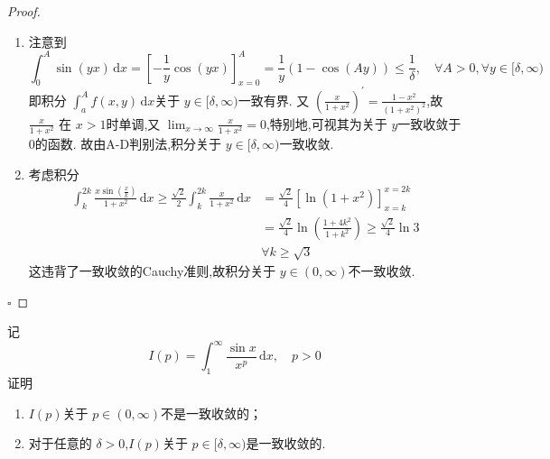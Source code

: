 \documentclass[lang=cn,12pt,color=green,fontset=none,thmcnt=section]{elegantbook}
\begin{document}
\begin{proof}
    \begin{enumerate}
        \item 注意到 $$
        \int_{0}^{A}\sin \left( yx \right)\,\mathrm{d} x =   \left[  -\frac{1}{y}\cos \left( yx \right) \right]_{x=0}^{A}   = \frac{1}{y}\left( 1-\cos \left( Ay \right)  \right) \le \frac{1}{ \delta },\quad \forall A >0,\forall y \in [ \delta ,\infty)
        $$即积分 $ \int_{a}^{A}f\left( x,y \right)\,\mathrm{d} x  $关于 $ y \in [ \delta ,\infty) $一致有界. 又 $ \left( \frac{x}{1+ x^{2}} \right)^{\prime}  =  \frac{1-x^{2} }{ \left( 1+ x^{2} \right)^{2} }    $,故 $ \frac{x}{1+ x^{2}} $   在 $ x>1 $时单调,又 $ \lim_{x \to \infty} \frac{x}{1+ x^{2}} =0$,特别地,可视其为关于 $ y $一致收敛于0的函数.
        故由A-D判别法,积分关于 $ y \in [ \delta ,\infty) $一致收敛.
        \item     考虑积分 $$
        \begin{aligned}
            \int_{k}^{2k } \frac{x \sin \left( \frac{x}{k} \right) }{1+ x^{2} }\,\mathrm{d} x  \ge  \frac{\sqrt{2} }{2 } \int_{k}^{2k} \frac{x}{1+ x^{2}} \,\mathrm{d} x &  =  \frac{\sqrt{2} }{4 } \left[ \ln \left( 1+ x^{2} \right)  \right]_{x=k}^{x=2k} \\ 
             & = \frac{\sqrt{2} }{4 } \ln  \left( \frac{1+ 4k^{2} }{ 1+ k^{2}}  \right) \ge \frac{\sqrt{2} }{4 }\ln 3      \\ 
               & \forall k\ge  \sqrt{3}
        \end{aligned}
        $$这违背了一致收敛的Cauchy准则,故积分关于 $ y\in \left( 0,\infty \right)  $不一致收敛. 
    \end{enumerate}
    

    \hfill $\square$
\end{proof}

\begin{exercise}
    记 $$
    I\left( p \right) = \int_{1}^{\infty} \frac{\sin x }{x^{p} } \,\mathrm{d} x,\quad p>0  
    $$    证明 \begin{enumerate}
        \item $ I\left( p \right)  $关于 $ p \in \left( 0,\infty \right)  $不是一致收敛的；
        \item 对于任意的 $  \delta >0 $,$ I\left( p \right)  $关于 $ p \in [ \delta ,\infty) $是一致收敛的.     
    \end{enumerate}
    
\end{exercise}
\end{document}
